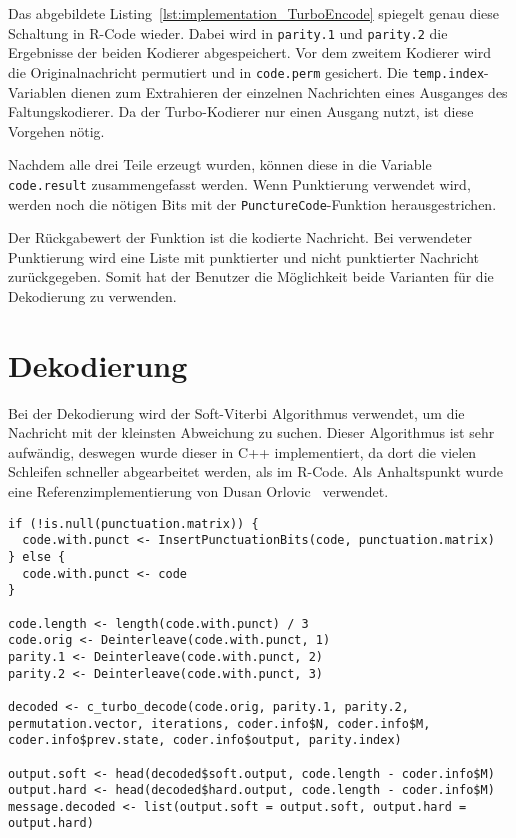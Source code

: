 Das abgebildete Listing~\ref{lst:implementation_TurboEncode} spiegelt genau diese Schaltung in R-Code wieder. Dabei wird in \texttt{parity.1} und \texttt{parity.2} die Ergebnisse der beiden Kodierer abgespeichert. Vor dem zweitem Kodierer wird die Originalnachricht permutiert und in \texttt{code.perm} gesichert. Die \texttt{temp.index}-Variablen dienen zum Extrahieren der einzelnen Nachrichten eines Ausganges des Faltungskodierer. Da der Turbo-Kodierer nur einen Ausgang nutzt, ist diese Vorgehen nötig.

Nachdem alle drei Teile erzeugt wurden, können diese in die Variable \texttt{code.result} zusammengefasst werden. Wenn Punktierung verwendet wird, werden noch die nötigen Bits mit der \texttt{PunctureCode}-Funktion herausgestrichen. 

Der Rückgabewert der Funktion ist die kodierte Nachricht. Bei verwendeter Punktierung wird eine Liste mit punktierter und nicht punktierter Nachricht zurückgegeben. Somit hat der Benutzer die Möglichkeit beide Varianten für die Dekodierung zu verwenden.  

\FloatBarrier
\section{Dekodierung}
\label{sec:implementation_decode}
Bei der Dekodierung wird der Soft-Viterbi Algorithmus verwendet, um die Nachricht mit der kleinsten Abweichung zu suchen. Dieser Algorithmus ist sehr aufwändig, deswegen wurde dieser in C++ implementiert, da dort die vielen Schleifen schneller abgearbeitet werden, als im R-Code. Als Anhaltspunkt wurde eine Referenzimplementierung von Dusan Orlovic~\cite{SOVA} verwendet.

\begin{lstlisting}[caption=Implementierung von \texttt{TurboDecode}, label={lst:implementation_TurboDecode}, float=!th]
if (!is.null(punctuation.matrix)) {
  code.with.punct <- InsertPunctuationBits(code, punctuation.matrix)
} else {
  code.with.punct <- code
}

code.length <- length(code.with.punct) / 3
code.orig <- Deinterleave(code.with.punct, 1)
parity.1 <- Deinterleave(code.with.punct, 2)
parity.2 <- Deinterleave(code.with.punct, 3)

decoded <- c_turbo_decode(code.orig, parity.1, parity.2, permutation.vector, iterations, coder.info$N, coder.info$M, coder.info$prev.state, coder.info$output, parity.index)

output.soft <- head(decoded$soft.output, code.length - coder.info$M)
output.hard <- head(decoded$hard.output, code.length - coder.info$M)
message.decoded <- list(output.soft = output.soft, output.hard = output.hard)
\end{lstlisting}


